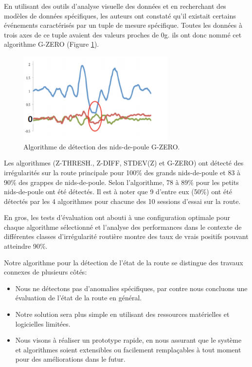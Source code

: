 En utilisant des outils d'analyse visuelle des données et en recherchant des modèles de données spécifiques, les auteurs ont constaté qu'il existait certains événements caractérisés par un tuple de mesure spécifique. Toutes les données à trois axes de ce tuple avaient des valeurs proches de 0g. ils ont donc nommé cet algorithme G-ZERO (Figure \ref{fig:graph_g_zero}).

\begin{figure}[h!]
  \center
  \includegraphics[width=0.7\textwidth]{Images/chapter2/relatedWork6.PNG}
  \caption{Algorithme de détection des nids-de-poule G-ZERO.}
  \label{fig:graph_g_zero}
\end{figure}

\bigbreak
Les algorithmes (Z-THRESH., Z-DIFF, STDEV(Z) et G-ZERO) ont détecté des irrégularités sur la route principale pour 100\% des grands nids-de-poule et 83 à 90\% des grappes de nids-de-poule. Selon l'algorithme, 78 à 89\% pour les petits nids-de-poule ont été détectés. Il est à noter que 9 d'entre eux (50\%) ont été détectés par les 4 algorithmes pour chacune des 10 sessions d'essai sur la route.

En gros, les tests d'évaluation ont abouti à une configuration optimale pour chaque algorithme sélectionné et l'analyse des performances dans le contexte de différentes classes d'irrégularité routière montre des taux de vrais positifs pouvant atteindre 90\%.

\bigbreak
\newpage
Notre algorithme pour la détection de l'état de la route se distingue des travaux connexes de plusieurs côtés:
\begin{itemize}
  \item Nous ne détectons pas d'anomalies spécifiques, par contre nous concluons une évaluation de l'état de la route en général.
  \item Notre solution sera plus simple en utilisant des ressources matérielles et logicielles limitées.
  \item Nous visons à réaliser un prototype rapide, en nous assurant que le système et algorithmes soient extensibles ou facilement remplaçables à tout moment pour des améliorations dans le futur.
\end{itemize}

